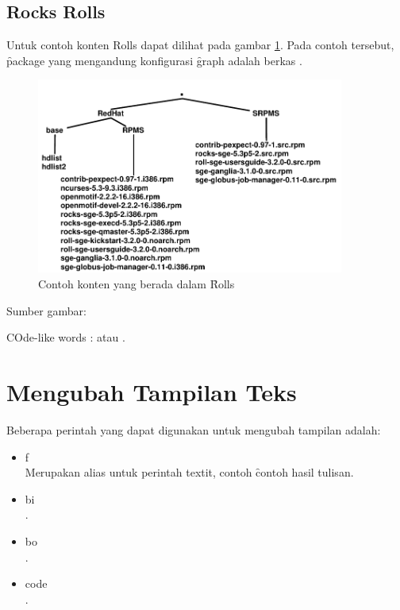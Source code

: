 \subsection{Rocks Rolls}
Untuk contoh konten Rolls dapat dilihat pada gambar \ref{fig:contohisiroll}. Pada contoh tersebut, \f{package} yang mengandung konfigurasi \f{graph} adalah berkas  \citep{paper.jackson}. 


\begin{figure}
	\centering
	\includegraphics[width=0.9\textwidth,height=0.6\textwidth]
		{pics/rollexample.pdf}
	\caption{Contoh konten yang berada dalam \f{Rolls}}
	\label{fig:contohisiroll}
\end{figure}
\begin{center}
{\small Sumber gambar: \citep{paper.jackson}}
\end{center}

COde-like words :  atau  \citep{paper.jackson}. 

\section{Mengubah Tampilan Teks}
Beberapa perintah yang dapat digunakan untuk mengubah tampilan adalah: 
\begin{itemize}
	\item \bslash f \\
		Merupakan alias untuk perintah \bslash textit, contoh 
		\f{contoh hasil tulisan}.
	\item \bslash bi \\
		.
	\item \bslash bo \\
		.
	\item \bslash code \\ 
		.
\end{itemize}


